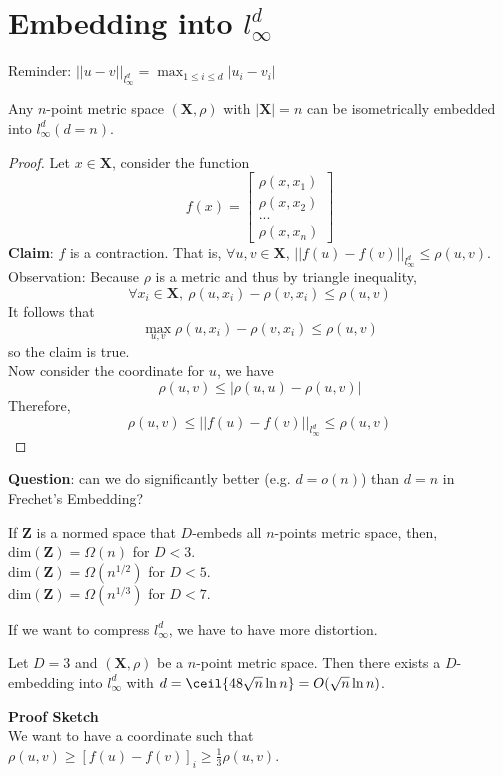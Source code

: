 \section{Embedding into $l_\infty^d$}
Reminder: $||u-v||_{l_\infty^d}=\max_{1\leq i \leq d} |u_i-v_i|$\\

\begin{theorem}[Frechet]
Any $n$-point metric space $(\mathbf{X}, \rho)$ with $|\mathbf{X}|=n$
can be isometrically embedded into $l_\infty^d (d=n)$.  
\end{theorem}
\begin{proof}
Let $x \in \mathbf{X}$, consider the function 
\[
f(x)=
\begin{bmatrix}
    \rho (x,x_1)\\
    \rho (x,x_2)\\
    ...\\
    \rho (x,x_n)
\end{bmatrix}
\]
\textbf{Claim}: $f$ is a contraction. That is, $\forall u,v \in
\mathbf{X}$, $||f(u)-f(v)||_{l_\infty^d} \leq \rho (u,v)$.\\ 
Observation: Because $\rho$ is a metric and thus by triangle
inequality, 
\[
\forall x_i \in \mathbf{X},\ \rho (u,x_i) - \rho (v,x_i) \leq \rho
(u,v) 
\]
It follows that 
\[
\max_{u,v} \rho (u,x_i) - \rho (v,x_i) \leq \rho (u,v)\]
so the claim is true.\\
Now consider the coordinate for $u$, we have 
\[
\rho (u,v) \leq | \rho (u,u) - \rho (u,v) |
\]
Therefore,
\[
\rho (u,v) \leq ||f(u)-f(v)||_{l_\infty^d} \leq \rho (u,v)
\]
\end{proof}
\textbf{Question}: can we do significantly better (e.g. $d=o(n)$) than
$d=n$ in Frechet's Embedding? 

\begin{theorem}
If $\mathbf{Z}$ is a normed space that $D$-embeds all $n$-points
metric space, then,\\ dim$(\mathbf{Z})=\Omega (n)$ for $D<3$.\\ 
dim$(\mathbf{Z})=\Omega (n^{1/2})$ for $D<5$.\\
dim$(\mathbf{Z})=\Omega (n^{1/3})$ for $D<7$.\\
\end{theorem}
If we want to compress $l_\infty^d$, we have to have more distortion.

\begin{theorem}
Let $D=3$ and $(\mathbf{X},\rho)$ be a $n$-point metric space. Then
there exists a $D$-embedding into $l_\infty^d$ with
$d=\ceil{48\sqrt{n}\ln n}=O(\sqrt{n}\ln n)$. 
\end{theorem}
\textbf{Proof Sketch}\\
We want to have a coordinate such that $\rho(u,v) \geq [f(u)-f(v)]_i
\geq \frac{1}{3}\rho(u,v)$. 

